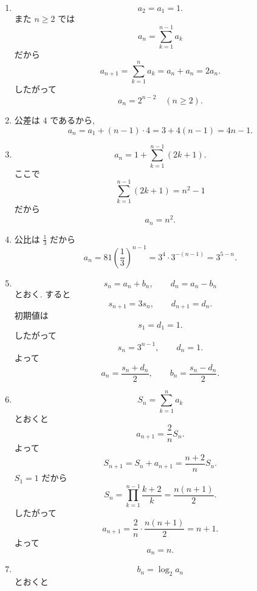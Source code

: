 \begin{enumerate}[label=\textbf{問\arabic*.},leftmargin=3.8em,format=\bookitemlink{practice-basic}{solution}{problem}]
\[            \qquad
            d_n=2.
          \]
              したがって
          \[
            a_n=5^{n-1}+1,
            \qquad
            b_n=5^{n-1}-1.
          \]
        \item \[
            a_2=a_1=1.
          \]
              また \(n\ge2\) では
          \[
            a_n=\sum_{k=1}^{n-1}a_k
          \]
              だから
          \[a_{n+1}
            =\sum_{k=1}^{n}a_k
            =a_n+a_n
            =2a_n.
          \]
              したがって
          \[
            a_n=2^{n-2}\quad(n\ge2).
          \]
        \item 公差は \(4\) であるから,
          \[
            a_n=a_1+(n-1)\cdot4
            =3+4(n-1)
            =4n-1.
          \]
        \item \[
            a_n
            =1+\sum_{k=1}^{n-1}(2k+1).
          \]
              ここで
          \[
            \sum_{k=1}^{n-1}(2k+1)
            =n^2-1
          \]
              だから
          \[
            a_n=n^2.
          \]
        \item 公比は \(\displaystyle \frac{1}{3}\) だから
          \[
            a_n=81\left(\frac13\right)^{n-1}
            =3^4\cdot3^{-(n-1)}
            =3^{5-n}.
          \]
        \item \[
            s_n=a_n+b_n,\qquad d_n=a_n-b_n
          \]
              とおく.
              すると
          \[
            s_{n+1}=3s_n,
            \qquad
            d_{n+1}=d_n.
          \]
              初期値は
          \[
            s_1=d_1=1.
          \]
              したがって
          \[
            s_n=3^{n-1},\qquad d_n=1.
          \]
              よって
          \[
            a_n=\frac{s_n+d_n}{2},
            \qquad
            b_n=\frac{s_n-d_n}{2}.
          \]
        \item \[
            S_n=\sum_{k=1}^{n}a_k
          \]
              とおくと
          \[
            a_{n+1}=\frac2nS_n.
          \]
              よって
          \[
            S_{n+1}
            =S_n+a_{n+1}
            =\frac{n+2}{n}S_n.
          \]
              \(S_1=1\) だから
          \[
            S_n
            =\prod_{k=1}^{n-1}\frac{k+2}{k}
            =\frac{n(n+1)}2.
          \]
              したがって
          \[
            a_{n+1}
            =\frac2n\cdot\frac{n(n+1)}2
            =n+1.
          \]
              よって
          \[
            a_n=n.
          \]
        \item \[
            b_n=\log_2a_n
          \]
              とおくと
          \[
\]
\end{enumerate}

